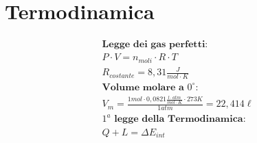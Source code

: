 \section{Termodinamica}

\begin{gather*}
    \textbf{Legge dei gas perfetti:} \\
        P \cdot V = n_{moli} \cdot R \cdot T \\
        R_{costante} = 8,31 \frac{J}{mol \cdot K} \\
    \textbf{Volume molare a $0^\circ$: } \\
        V_m = \frac{1 \textit{mol} \cdot 0,0821 \frac{l \cdot atm}{mol \cdot K} \cdot 273 K}{1 \textit{atm}} =  22,414 \ell \\
    \textbf{$1^a$ legge della Termodinamica:} \\
        Q + L = \Delta E_{int}
\end{gather*}
